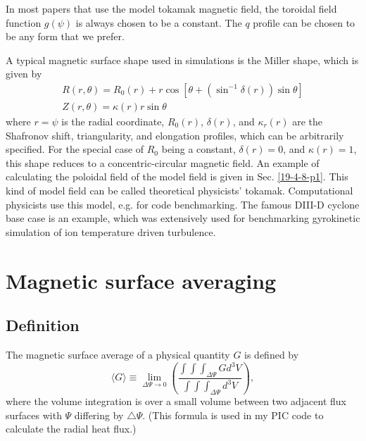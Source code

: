 \documentclass{article}
\begin{document}
In most papers that use the model tokamak magnetic field, the toroidal field
function $g (\psi)$ is always chosen to be a constant. The $q$ profile can be
chosen to be any form that we prefer.

A typical magnetic surface shape used in simulations is the Miller shape,
which is given by
\begin{equation}
  \begin{array}{l}
    R (r, \theta) = R_0 (r) + r \cos [\theta + (\sin^{- 1} \delta (r)) \sin
    \theta]\\
    Z (r, \theta) = \kappa (r) r \sin \theta
  \end{array}
\end{equation}
where $r = \psi$ is the radial coordinate, $R_0 (r)$, $\delta (r)$, and
$\kappa_r (r)$ are the Shafronov shift, triangularity, and elongation
profiles, which can be arbitrarily specified. For the special case of $R_0$
being a constant, $\delta (r) = 0$, and $\kappa (r) = 1$, this shape reduces
to a concentric-circular magnetic field. An example of calculating the
poloidal field of the model field is given in Sec. \ref{19-4-8-p1}. This kind
of model field can be called theoretical physicists' tokamak. Computational
physicists use this model, e.g. for code benchmarking. The famous DIII-D
cyclone base case is an example, which was extensively used for benchmarking
gyrokinetic simulation of ion temperature driven turbulence.

\section{Magnetic surface averaging}

\subsection{Definition}

The magnetic surface average of a physical quantity $G$ is defined by
\begin{equation}
  \label{6-14-2} \langle G \rangle \equiv \lim_{\Delta \Psi \rightarrow 0}
  \left( \frac{\int \int \int_{\Delta \Psi} G d^3 V}{\int \int \int_{\Delta
  \Psi} d^3 V} \right),
\end{equation}
where the volume integration is over a small volume between two adjacent flux
surfaces with $\Psi$ differing by $\triangle \Psi$. (This formula is used in
my PIC code to calculate the radial heat flux.)
\end{document}
